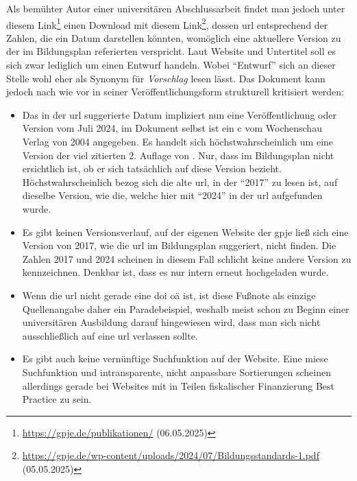 Als bemühter Autor einer universitären Abschlussarbeit findet man jedoch unter diesem Link\footnote{\url{https://gpje.de/publikationen/} (06.05.2025)} einen Download mit diesem Link\footnote{\url{https://gpje.de/wp-content/uploads/2024/07/Bildungsstandards-1.pdf} (05.05.2025)}, dessen \gls{url} entsprechend der Zahlen, die ein Datum darstellen könnten, womöglich eine aktuellere Version zu der im Bildungsplan \autocite[][9]{bplan} referierten verspricht. Laut Website und Untertitel soll es sich zwar lediglich um einen Entwurf handeln. Wobei \enquote{Entwurf} sich an dieser Stelle wohl eher als Synonym für \emph{Vorschlag} lesen lässt.  Das Dokument kann jedoch nach wie vor in seiner Veröffentlichungsform strukturell kritisiert werden:
\begin{itemize}
    \item Das in der \gls{url} suggerierte Datum impliziert nun eine Veröffentlichung oder Version vom Juli 2024, im Dokument selbst ist ein \gls{c} vom Wochenschau Verlag von 2004 angegeben. Es handelt sich höchstwahrscheinlich um eine Version der viel zitierten 2. Auflage von \citeyear[]{gpje2004}. Nur, dass im Bildungsplan nicht ersichtlich ist, ob er sich tatsächlich auf diese Version bezieht. Höchstwahrscheinlich bezog sich die alte \gls{url}, in der \enquote{2017} zu lesen ist, auf dieselbe Version, wie die, welche hier mit \enquote{2024} in der \gls{url} aufgefunden wurde. 
    
    
    \item Es gibt keinen Versionsverlauf, auf der eigenen Website der \gls{gpje} ließ sich eine Version von 2017, wie die \gls{url} im Bildungsplan \autocite[][9]{bplan} suggeriert, nicht finden. Die Zahlen 2017 und 2024 scheinen in diesem Fall schlicht keine andere Version zu kennzeichnen. Denkbar ist, dass es nur intern erneut hochgeladen wurde.

    \item Wenn die \gls{url} nicht gerade eine \gls{doi} \gls{oä} ist, ist diese Fußnote als einzige Quellenangabe daher ein Paradebeispiel, weshalb meist schon zu Beginn einer universitären Ausbildung darauf hingewiesen wird, dass man sich nicht ausschließlich auf eine \gls{url} verlassen sollte. 
    
    \item Es gibt auch keine vernünftige Suchfunktion auf der Website. Eine miese Suchfunktion und intransparente, nicht anpassbare Sortierungen scheinen allerdings gerade bei Websites mit in Teilen fiskalischer Finanzierung Best Practice zu sein.
    

\end{itemize}
